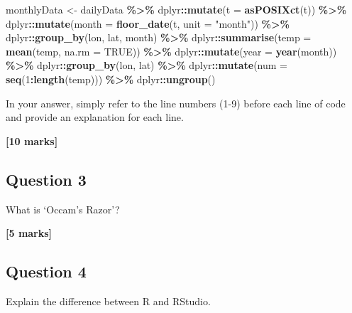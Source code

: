 \documentclass[
  10t,
]{article}
\newenvironment{Shaded}{\begin{snugshade}}{\end{snugshade}}
\newcommand{\AttributeTok}[1]{\textcolor[rgb]{0.13,0.29,0.53}{#1}}
\newcommand{\ConstantTok}[1]{\textcolor[rgb]{0.56,0.35,0.01}{#1}}
\newcommand{\DecValTok}[1]{\textcolor[rgb]{0.00,0.00,0.81}{#1}}
\newcommand{\FunctionTok}[1]{\textcolor[rgb]{0.13,0.29,0.53}{\textbf{#1}}}
\newcommand{\NormalTok}[1]{#1}
\newcommand{\OtherTok}[1]{\textcolor[rgb]{0.56,0.35,0.01}{#1}}
\newcommand{\SpecialCharTok}[1]{\textcolor[rgb]{0.81,0.36,0.00}{\textbf{#1}}}
\newcommand{\StringTok}[1]{\textcolor[rgb]{0.31,0.60,0.02}{#1}}
\begin{document}
\begin{Shaded}
\begin{Highlighting}[]
\NormalTok{monthlyData }\OtherTok{\textless{}{-}}\NormalTok{ dailyData }\SpecialCharTok{\%\textgreater{}\%}
\NormalTok{    dplyr}\SpecialCharTok{::}\FunctionTok{mutate}\NormalTok{(}\AttributeTok{t =} \FunctionTok{asPOSIXct}\NormalTok{(t)) }\SpecialCharTok{\%\textgreater{}\%}
\NormalTok{    dplyr}\SpecialCharTok{::}\FunctionTok{mutate}\NormalTok{(}\AttributeTok{month =} \FunctionTok{floor\_date}\NormalTok{(t, }\AttributeTok{unit =} \StringTok{"month"}\NormalTok{)) }\SpecialCharTok{\%\textgreater{}\%}
\NormalTok{    dplyr}\SpecialCharTok{::}\FunctionTok{group\_by}\NormalTok{(lon, lat, month) }\SpecialCharTok{\%\textgreater{}\%}
\NormalTok{    dplyr}\SpecialCharTok{::}\FunctionTok{summarise}\NormalTok{(}\AttributeTok{temp =} \FunctionTok{mean}\NormalTok{(temp, }\AttributeTok{na.rm =} \ConstantTok{TRUE}\NormalTok{)) }\SpecialCharTok{\%\textgreater{}\%}
\NormalTok{    dplyr}\SpecialCharTok{::}\FunctionTok{mutate}\NormalTok{(}\AttributeTok{year =} \FunctionTok{year}\NormalTok{(month)) }\SpecialCharTok{\%\textgreater{}\%}
\NormalTok{    dplyr}\SpecialCharTok{::}\FunctionTok{group\_by}\NormalTok{(lon, lat) }\SpecialCharTok{\%\textgreater{}\%}
\NormalTok{    dplyr}\SpecialCharTok{::}\FunctionTok{mutate}\NormalTok{(}\AttributeTok{num =} \FunctionTok{seq}\NormalTok{(}\DecValTok{1}\SpecialCharTok{:}\FunctionTok{length}\NormalTok{(temp))) }\SpecialCharTok{\%\textgreater{}\%}
\NormalTok{    dplyr}\SpecialCharTok{::}\FunctionTok{ungroup}\NormalTok{()}
\end{Highlighting}
\end{Shaded}

In your answer, simply refer to the line numbers (1-9) before each line
of code and provide an explanation for each line.

\textbf{{[}10 marks{]}}

\subsection{Question 3}\label{question-3}

What is `Occam's Razor'?

\textbf{{[}5 marks{]}}

\subsection{Question 4}\label{question-4}

Explain the difference between R and RStudio.
\end{document}
